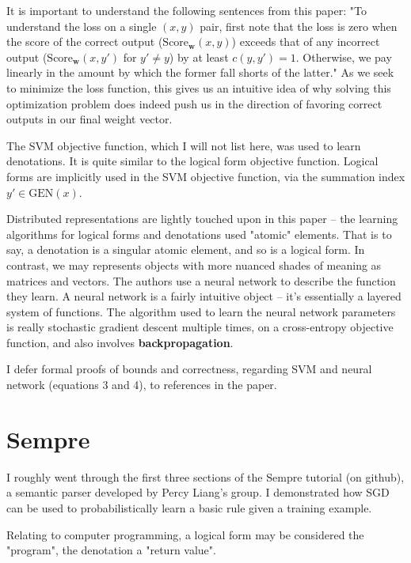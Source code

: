 \documentclass[twoside]{article}
\theoremstyle{definition}
\theoremstyle{definition}
\theoremstyle{remark}
\begin{document}
It is important to understand the following sentences from this paper: "To understand the
loss on a single $(x,y)$ pair, first note that the loss is zero when the score of the
correct output ($\textrm{Score}_{\textbf{w}}(x,y)$) exceeds that of any incorrect output 
($\textrm{Score}_{\textbf{w}}(x,y')$ for $y' \neq y$) by at least $c(y,y') = 1$. Otherwise,
we pay linearly in the amount by which the former fall shorts of the latter." As we seek
to minimize the loss function, this gives us an intuitive idea of why solving this
optimization problem does indeed push us in the direction of favoring correct outputs
in our final weight vector.

The SVM objective function, which I will not list here, was used to learn
denotations. It is quite similar to the logical form objective function. Logical
forms are implicitly used in the SVM objective function, via the summation
index $y' \in \textrm{GEN}(x)$.

Distributed representations are lightly touched upon in this paper -- the learning
algorithms for logical forms and denotations used "atomic" elements. That is to say,
a denotation is a singular atomic element, and so is a logical form. In contrast, we
may represents objects with more nuanced shades of meaning as matrices and vectors.
The authors use a neural network to describe the function they learn. A neural
network is a fairly intuitive object -- it's essentially a layered system of functions.
The algorithm used to learn the neural network parameters is really stochastic gradient
descent multiple times, on a cross-entropy objective function, and also involves
\textbf{backpropagation}.

I defer formal proofs of bounds and correctness, regarding SVM and neural network (equations 3 and 4), to references in the paper.

\section{Sempre}

I roughly went through the first three sections of the Sempre tutorial (on github), a semantic parser developed
by Percy Liang's group. I demonstrated how SGD can be used to probabilistically learn a basic rule given a training example.

Relating to computer programming, a logical form may be considered
the "program", the denotation a "return value".
\end{document}
